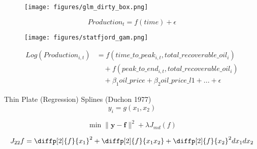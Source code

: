 \documentclass{beamer}
\begin{document}
\begin{frame}[plain]
	\begin{figure}
	\texttt{[image: figures/glm\_dirty\_box.png]}
	\caption*{}
	\label{glm_dirty_box}
	\end{figure}
\end{frame}


\begin{frame}[plain]
	\begin{equation}
	Production_{t}=f(time) + \epsilon
		\label{simp_eqn}
	\end{equation}
\end{frame}


\begin{frame}[plain]
	\begin{figure}
		\texttt{[image: figures/statfjord\_gam.png]}
		\caption*{}
		\label{statfjord_gam}
	\end{figure}
\end{frame}


\begin{frame}[plain]

	\begin{equation}
	\begin{split}
		Log(Production_{i,t})&=f(time\_to\_peak_{i,t}, total\_recoverable\_oil_i) \\
		& \quad + f(peak\_to\_end_{i,t}, total\_recoverable\_oil_i) \\
		& \quad + \beta_1 oil\_price + \beta_2 oil\_price\_l1 + ... +  \epsilon
	\end{split}
	\label{gam_price_eqn}
	\end{equation}

\end{frame}



\begin{frame}[plain]
	Thin Plate (Regression) Splines (Duchon 1977)
	\begin{equation}
	y_i = g(x_1, x_2)
	\end{equation}

	\begin{equation}
	\min \|\boldsymbol{y-f}\|^2 + \lambda J_{md}(f)
	\end{equation}

	\begin{equation}
	J_{22}{f}= \diffp[2]{f}{x_1}^2 + \diffp[2]{f}{{x_1}{x_2}} + \diffp[2]{f}{x_2}^2dx_1 dx_2
	\end{equation}
\end{frame}
\end{document}
